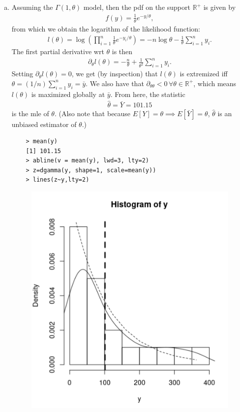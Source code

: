 \documentclass{book}
\theoremstyle{definition}
\newcommand{\p}{\partial}
\newcommand{\R}{\mathbb{R}}
\newcommand{\f}[2]{\frac{#1}{#2}}
\newcommand{\lp}{\left(}
\newcommand{\rp}{\right)}
\begin{document}
\begin{enumerate}[(a)]
	\item Assuming the $\Gamma(1,\theta)$ model, then the pdf on the support $\R^+$ is given by
	\begin{align}
	f(y) = \f{1}{\theta}e^{-y/\theta},
	\end{align}
	from which we obtain the logarithm of the likelihood function:
	\begin{align}
	l(\theta) = \log\lp \prod^n_{i=1} \f{1}{\theta}e^{-y_i/\theta} \rp = -n\log\theta - \f{1}{\theta}\sum^n_{i=1}y_i.
	\end{align}
	The first partial derivative wrt $\theta$ is then
	\begin{align}
	\p_\theta l(\theta) = -\f{n}{\theta} + \f{1}{\theta^2}\sum^n_{i=1}y_i.
	\end{align}
	Setting $\p_\theta l(\theta) = 0$, we get (by inspection) that $l(\theta)$ is extremized iff $\theta = (1/n)\sum^n_{i=1}y_i = \bar{y}$. We also have that $\p_{\theta\theta} < 0\, \forall \theta \in \R^+$, which means $l(\theta)$ is maximized globally at $\bar{y}$. From here, the statistic 
	\begin{align}
	\hat{\theta} = \bar{Y} = \mathbf{101.15}
	\end{align} 
	is the mle of $\theta$. (Also note that because $E[Y] = \theta \implies E[\bar{Y}] = \theta$, $\hat{\theta}$ is an unbiased estimator of $\theta$.)
	\begin{lstlisting}
	> mean(y)
	[1] 101.15
	> abline(v = mean(y), lwd=3, lty=2)
	> z=dgamma(y, shape=1, scale=mean(y))
	> lines(z~y,lty=2)
	\end{lstlisting}
	\begin{figure}[!htb]
		\centering
		\includegraphics[scale=0.3]{411b}
	\end{figure}
	

\end{enumerate}
\end{document}
